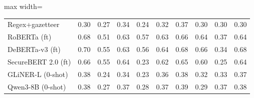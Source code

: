 \begin{table}[t]
\begin{adjustbox}{max width=\textwidth}
\begin{tabular}{lrrrrrrrrr}
Regex+gazetteer & 0.30 & 0.27 & 0.34 & 0.24 & 0.32 & 0.37 & 0.30 & 0.30 & 0.30 \\
RoBERTa (ft) & 0.68 & 0.51 & 0.63 & 0.57 & 0.63 & 0.66 & 0.64 & 0.37 & 0.64 \\
DeBERTa-v3 (ft) & 0.70 & 0.55 & 0.63 & 0.56 & 0.64 & 0.68 & 0.66 & 0.34 & 0.68 \\
SecureBERT 2.0 (ft) & 0.66 & 0.55 & 0.64 & 0.23 & 0.62 & 0.65 & 0.60 & 0.25 & 0.64 \\
GLiNER-L (0-shot) & 0.38 & 0.24 & 0.34 & 0.23 & 0.36 & 0.38 & 0.32 & 0.33 & 0.37 \\
Qwen3-8B (0-shot) & 0.38 & 0.27 & 0.37 & 0.28 & 0.37 & 0.39 & 0.29 & 0.37 & 0.38 \\
\bottomrule
\end{tabular}
\end{adjustbox}
\end{table}